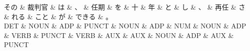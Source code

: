 \documentclass[tikz,border=5pt]{standalone}
\begin{document}
\normalsize
\begin{dependency}[edge unit distance=12.0pt]
    \begin{deptext}[column sep=1em]
        その \& 裁判官 \& は \& 、 \& 任期 \& を \& 十 \& 年 \& と \& し \& 、 \& 再任 \& さ \& れる \& こと \& が \& できる \& 。\\
        DET \& NOUN \& ADP \& PUNCT \& NOUN \& ADP \& NUM \& NOUN \& ADP \& VERB \& PUNCT \& VERB \& AUX \& AUX \& NOUN \& ADP \& AUX \& PUNCT\\
    \end{deptext}
\end{dependency}
\end{document}
